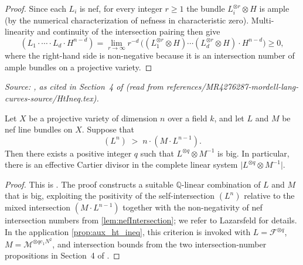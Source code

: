 \begin{proof}
  Since each \(L_i\) is nef, for every integer \(r \ge 1\) the bundle
  \(L_i^{\otimes r} \otimes H\) is ample (by the numerical characterization of
  nefness in characteristic zero).  Multi-linearity and continuity of the
  intersection pairing then give
  \[
    (L_1 \cdot \cdots \cdot L_d \cdot H^{n-d})
    = \lim_{r \to \infty} r^{-d}\,
      \bigl((L_1^{\otimes r} \otimes H) \cdots (L_d^{\otimes r} \otimes H)
      \cdot H^{n-d}\bigr) \ge 0,
  \]
  where the right-hand side is non-negative because it is an intersection number
  of ample bundles on a projective variety.
\end{proof}

\begin{theorem}
  \label{thm:siuCriterion}
  \textit{Source: \cite[Theorem~2.2.15]{PosAlgGeom}, as cited in Section~4 of
  \cite{MR4276287-mordell-lang-curves}
  (read from references/MR4276287-mordell-lang-curves-source/HtIneq.tex).}

  Let \(X\) be a projective variety of dimension \(n\) over a field \(k\), and
  let \(L\) and \(M\) be nef line bundles on \(X\).  Suppose that
  \[
    (L^n) \;>\; n \cdot (M \cdot L^{n-1}).
  \]
  Then there exists a positive integer \(q\) such that
  \(L^{\otimes q} \otimes M^{-1}\) is big.  In particular, there is an effective
  Cartier divisor in the complete linear system
  \(\bigl|L^{\otimes q} \otimes M^{-1}\bigr|\).
\end{theorem}

\begin{proof}
  This is \cite[Theorem~2.2.15]{PosAlgGeom}.  The proof constructs a suitable
  \(\mathbb{Q}\)-linear combination of \(L\) and \(M\) that is big, exploiting the
  positivity of the self-intersection \((L^n)\) relative to the mixed intersection
  \((M \cdot L^{n-1})\) together with the non-negativity of nef intersection
  numbers from \cref{lem:nefIntersection}; we refer to Lazarsfeld for details.
  In the application \cref{prop:aux_ht_ineq}, this criterion is invoked with
  \(L = \mathcal{F}^{\otimes q}\), \(M = \mathcal{M}^{\otimes qc_1N^2}\), and
  intersection bounds from the two intersection-number propositions in
  Section~4 of \cite{MR4276287-mordell-lang-curves}.
\end{proof}


